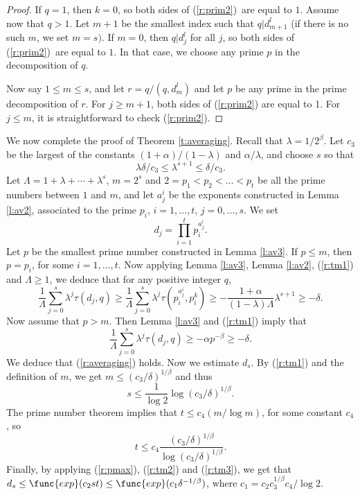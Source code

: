 \documentclass{amsart}
\numberwithin {equation}{section}
\begin{document}
\begin{proof}
If $q=1$, then $k=0$, so both sides of (\ref{r:prim2})\ are equal to $1$.
Assume now that $q>1$. Let $m+1$ be the smallest index such that $q|d_{m+1}^{l}$ (if there is no such $m$, we set $m=s)$. If $m=0$, then $q|d_{j}^{l}$ for all $j$, so both sides of (\ref{r:prim2})\ are equal to $1$. In that case, we choose any prime $p$ in the decomposition of $q$.

Now say $1\leq m\leq s$, and let $r=q/(q,d_{m}^{l})$ and let $p$ be any
prime in the prime decomposition of $r$. For $j\geq m+1$, both sides of (\ref{r:prim2}) are equal to 1. For $j\leq m$, it is straightforward to check (\ref{r:prim2}).
\end{proof}

We now complete the proof of Theorem \ref{t:averaging}. Recall that $\lambda
=1/2^{\beta }$. Let $c_3$ be the largest of the constants $(1+\alpha
)/(1-\lambda )$ and $\alpha /\lambda $, and choose $s$ so that 
\begin{equation}
\lambda \delta /c_3\leq \lambda ^{s+1}\leq \delta /c_3.  \label{r:tm1}
\end{equation}
Let $\Lambda =1+\lambda +\cdots +\lambda ^s$, $m=2^s$ and $2=p_1<p_2<\ldots
<p_t$ be all the prime numbers between $1$ and $m$, and let $a_j^i$ be the
exponents constructed in Lemma \ref{l:av2}, associated to the prime $p_i$, $i=1,\ldots ,t$, $j=0,\ldots ,s$. We set 
\begin{equation*}
d_{j}=\prod _{i=1}^tp_i^{a_{j}^i}{\text {.}}
\end{equation*}
Let $p$ be the smallest prime number constructed in Lemma \ref{l:av3}. If $p\leq m$, then $p=p_{i}$, for some $i=1,\ldots ,t$. Now applying Lemma \ref{l:av3}, Lemma \ref{l:av2}, (\ref{r:tm1}) and $\Lambda \geq 1$, we deduce
that for any positive integer $q$, 
\begin{equation*}
\frac{1}{\Lambda }\sum _{j=0}^{s}\lambda ^{j}\tau (d_{j},q)\geq \frac{1}{\Lambda }\sum _{j=0}^{s}\lambda ^{j}\tau (p_i^{a_{j}^i},p_i^{k})\geq -\frac{1+\alpha }{(1-\lambda )\Lambda }\lambda ^{s+1}\geq -\delta {\text {.}}
\end{equation*}
Now assume that $p>m$. Then Lemma \ref{l:av3} and (\ref{r:tm1}) imply that 
\begin{equation*}
\frac{1}{\Lambda }\sum _{j=0}^{s}\lambda ^{j}\tau (d_{j},q)\geq -\alpha
p^{-\beta }\geq -\delta {\text {.}}
\end{equation*}
We deduce that (\ref{r:averaging}) holds. Now we estimate $d_s$. By (\ref{r:tm1}) and the definition of $m$, we get $m\leq (c_3/\delta )^{1/\beta }$
and thus 
\begin{equation}
s\leq \frac{1}{\log 2}\log (c_3/\delta )^{1/\beta }.  \label{r:tm2}
\end{equation}
The prime number theorem implies that $t\leq c_4(m/\log m)$, for some
constant $c_4$, so 
\begin{equation}
t\leq c_4\frac{(c_3/\delta )^{1/\beta }}{\log (c_3/\delta )^{1/\beta }}.
\label{r:tm3}
\end{equation}
Finally, by applying (\ref{r:pmax}), (\ref{r:tm2}) and (\ref{r:tm3}), we get
that $d_s\leq \func{exp}(c_2st)\leq \func{exp}(c_1\delta ^{-1/\beta })$,
where $c_1=c_2c_3^{1/\beta }c_4/\log 2$.
\end{document}
